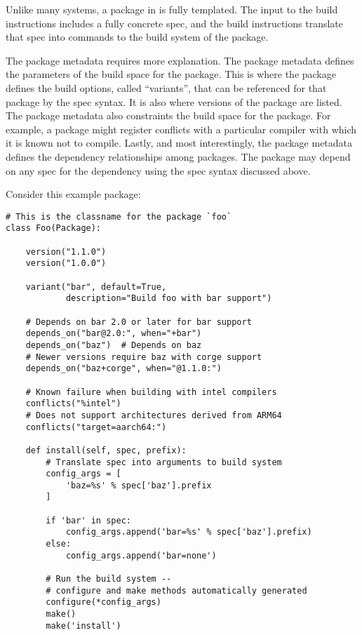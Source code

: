 Unlike many systems, a package in \spack{} is fully templated. The input to the build instructions includes a fully concrete spec, and the build instructions translate that spec into commands to the build system of the package.

The package metadata requires more explanation. The package metadata defines the parameters of the build space for the package. This is where the package defines the build options, called ``variants'', that can be referenced for that package by the spec syntax. It is also where versions of the package are listed. The package metadata also constraints the build space for the package. For example, a package might register conflicts with a particular compiler with which it is known not to compile. Lastly, and most interestingly, the package metadata defines the dependency relationships among packages. The package may depend on any spec for the dependency using the spec syntax discussed above.

Consider this example package:

\begin{verbatim}
# This is the classname for the package `foo`
class Foo(Package):

    version("1.1.0")
    version("1.0.0")

    variant("bar", default=True,
            description="Build foo with bar support")

    # Depends on bar 2.0 or later for bar support
    depends_on("bar@2.0:", when="+bar")
    depends_on("baz")  # Depends on baz
    # Newer versions require baz with corge support
    depends_on("baz+corge", when="@1.1.0:")

    # Known failure when building with intel compilers
    conflicts("%intel")
    # Does not support architectures derived from ARM64
    conflicts("target=aarch64:")

    def install(self, spec, prefix):
        # Translate spec into arguments to build system
        config_args = [
            'baz=%s' % spec['baz'].prefix
        ]

        if 'bar' in spec:
            config_args.append('bar=%s' % spec['baz'].prefix)
        else:
            config_args.append('bar=none')

        # Run the build system -- 
        # configure and make methods automatically generated
        configure(*config_args)
        make()
        make('install')
\end{verbatim}

